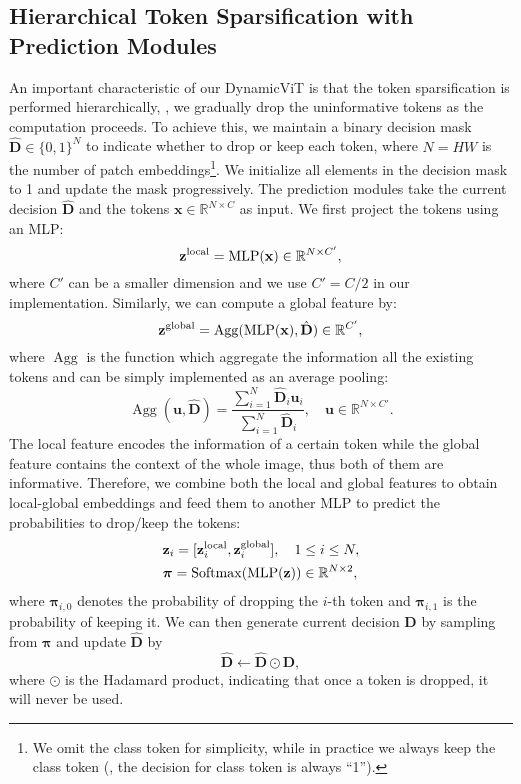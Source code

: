 \documentclass{article}
\newcommand{\dynamvit}{DynamicViT}
\DeclareMathOperator{\MLP}{MLP}
\DeclareMathOperator{\Agg}{Agg}
\DeclareMathOperator{\softmax}{Softmax}
\begin{document}
\subsection{Hierarchical Token Sparsification with Prediction Modules}
An important characteristic of our \dynamvit{} is that the token sparsification is performed hierarchically, \ie, we gradually drop the uninformative tokens as the computation proceeds. To achieve this, we maintain a binary decision mask $\hat{\mathbf{D}}\in \{0, 1\}^{N}$ to indicate whether to drop or keep each token, where $N=HW$ is the number of patch embeddings\footnote{We omit the class token for simplicity, while in practice we always keep the class token (\ie, the decision for class token is always ``1'').}. We initialize all elements in the decision mask to 1 and update the mask progressively. The prediction modules take the current decision $\hat{\mathbf{D}}$ and the tokens $\mathbf{x}\in\mathbb{R}^{N\times C}$ as input. We first project the tokens using an MLP:
\begin{equation}
    \mathbf{z}^{\rm local} = \MLP(\mathbf{x})\in \mathbb{R}^{N\times C'},
\end{equation}
where $C'$ can be a smaller dimension and we use $C'=C/2$ in our implementation. Similarly, we can compute a global feature by:
\begin{equation}
    \mathbf{z}^{\rm global}=\Agg(\MLP(\mathbf{x}), \hat{\mathbf{D}})\in \mathbb{R}^{C'},
\end{equation}
where $\Agg$ is the function which aggregate the information all the existing tokens and can be simply implemented as an average pooling:
\begin{equation}
    \Agg(\mathbf{u}, \hat{\mathbf{D}}) = \frac{\sum_{i=1}^{N}\hat{\mathbf{D}}_i \mathbf{u}_i}{\sum_{i=1}^{N}\hat{\mathbf{D}}_i}, \quad \mathbf{u}\in \mathbb{R}^{N\times C'}.
\end{equation}
The local feature encodes the information of a certain token while the global feature contains the context of the whole image, thus both of them are informative. Therefore, we combine both the local and global features to obtain local-global embeddings and feed them to another MLP to predict the probabilities to drop/keep the tokens:
\begin{align}
    &\mathbf{z}_i = [\mathbf{z}_i^{\rm local}, \mathbf{z}_i^{\rm global}],\quad 1\le i\le N,\\
    &\bm{\pi} = \softmax(\MLP(\mathbf{z})) \in \mathbb{R}^{N\times 2},
\end{align}
where $\bm{\pi}_{i, 0}$ denotes the probability of dropping the $i$-th token and $\bm{\pi}_{i, 1}$ is the probability of keeping it. We can then generate current decision $\mathbf{D}$ by sampling from $\bm{\pi}$ and update $\hat{\mathbf{D}}$ by
\begin{equation}
    \hat{\mathbf{D}}\leftarrow \hat{\mathbf{D}} \odot \mathbf{D},
\end{equation}
where $\odot$ is the Hadamard product, indicating that once a token is dropped, it will never be used.
\end{document}
